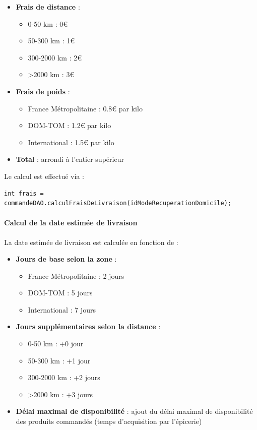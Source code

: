 \begin{itemize}
    \item \textbf{Frais de distance} :
    \begin{itemize}
        \item 0-50 km : 0€
        \item 50-300 km : 1€
        \item 300-2000 km : 2€
        \item >2000 km : 3€
    \end{itemize}
    
    \item \textbf{Frais de poids} :
    \begin{itemize}
        \item France Métropolitaine : 0.8€ par kilo
        \item DOM-TOM : 1.2€ par kilo
        \item International : 1.5€ par kilo
    \end{itemize}
    
    \item \textbf{Total} : arrondi à l'entier supérieur
\end{itemize}

Le calcul est effectué via :

\begin{verbatim}
int frais = commandeDAO.calculFraisDeLivraison(idModeRecuperationDomicile);
\end{verbatim}

\paragraph{Calcul de la date estimée de livraison}

La date estimée de livraison est calculée en fonction de :

\begin{itemize}
    \item \textbf{Jours de base selon la zone} :
    \begin{itemize}
        \item France Métropolitaine : 2 jours
        \item DOM-TOM : 5 jours
        \item International : 7 jours
    \end{itemize}
    
    \item \textbf{Jours supplémentaires selon la distance} :
    \begin{itemize}
        \item 0-50 km : +0 jour
        \item 50-300 km : +1 jour
        \item 300-2000 km : +2 jours
        \item >2000 km : +3 jours
    \end{itemize}
    
    \item \textbf{Délai maximal de disponibilité} : ajout du délai maximal de disponibilité des produits commandés (temps d'acquisition par l'épicerie)
\end{itemize}


